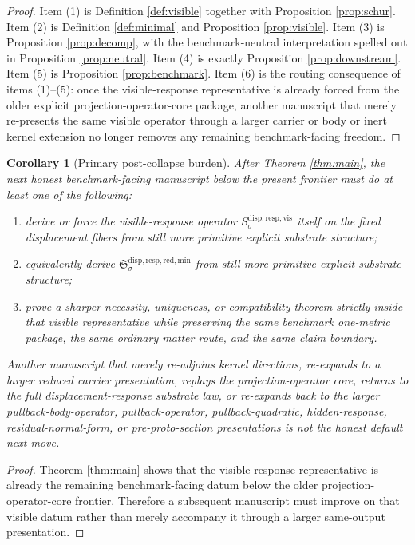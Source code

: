 \documentclass[11pt]{article}
\newcommand{\VisibleResponseOperator}[1]{S_{#1}^{\mathrm{disp,resp,vis}}}
\newcommand{\MinimalReducedStructure}{\mathfrak S^{\mathrm{disp,resp,red,min}}}
\newtheorem{corollary}{Corollary}
\begin{document}
\begin{proof}
Item (1) is Definition \ref{def:visible} together with Proposition \ref{prop:schur}. Item (2) is Definition \ref{def:minimal} and Proposition \ref{prop:visible}. Item (3) is Proposition \ref{prop:decomp}, with the benchmark-neutral interpretation spelled out in Proposition \ref{prop:neutral}. Item (4) is exactly Proposition \ref{prop:downstream}. Item (5) is Proposition \ref{prop:benchmark}. Item (6) is the routing consequence of items (1)--(5): once the visible-response representative is already forced from the older explicit projection-operator-core package, another manuscript that merely re-presents the same visible operator through a larger carrier or body or inert kernel extension no longer removes any remaining benchmark-facing freedom.
\end{proof}

\begin{corollary}[Primary post-collapse burden]
\label{cor:next}
After Theorem \ref{thm:main}, the next honest benchmark-facing manuscript below the present frontier must do at least one of the following:
\begin{enumerate}
    \item derive or force the visible-response operator \(\VisibleResponseOperator{\sigma}\) itself on the fixed displacement fibers from still more primitive explicit substrate structure;
    \item equivalently derive \(\MinimalReducedStructure_{\sigma}\) from still more primitive explicit substrate structure;
    \item prove a sharper necessity, uniqueness, or compatibility theorem strictly inside that visible representative while preserving the same benchmark one-metric package, the same ordinary matter route, and the same claim boundary.
\end{enumerate}
Another manuscript that merely re-adjoins kernel directions, re-expands to a larger reduced carrier presentation, replays the projection-operator core, returns to the full displacement-response substrate law, or re-expands back to the larger pullback-body-operator, pullback-operator, pullback-quadratic, hidden-response, residual-normal-form, or pre-proto-section presentations is not the honest default next move.
\end{corollary}

\begin{proof}
Theorem \ref{thm:main} shows that the visible-response representative is already the remaining benchmark-facing datum below the older projection-operator-core frontier. Therefore a subsequent manuscript must improve on that visible datum rather than merely accompany it through a larger same-output presentation.
\end{proof}
\end{document}
